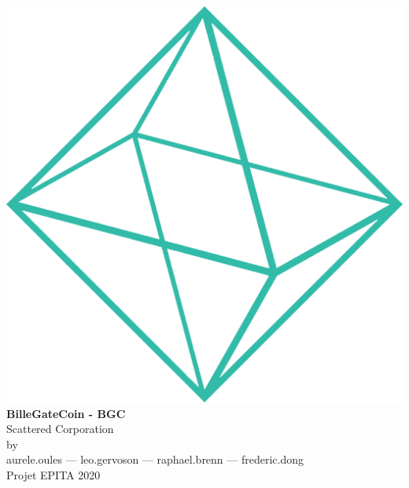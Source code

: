 \documentclass{article}
\begin{document}
\makeatletter
    \begin{titlepage}
        \begin{center}
            \pagecolor{background}
            \color{white}
            \includegraphics[width=0.5\linewidth]{assets/shape.png}\\[10ex]
            {\huge \bfseries BilleGateCoin - BGC}\\[2ex] 
            {\LARGE Scattered Corporation}\\[20ex]
            \large{by\\[2ex]aurele.oules  —  leo.gervoson  —  raphael.brenn  —  frederic.dong}\\[16ex] 
            {\large Projet EPITA 2020}
        \end{center}
    \end{titlepage}
\makeatother
\thispagestyle{empty}

\newpage
\begin{center}
\color{white}
\tableofcontents
\end{center}
\newpage
\pagecolor{white}
\sectionfont{\color{greendark}}  %

\fancyhf{}
\renewcommand{\headrulewidth}{0pt}
\renewcommand{\footrulewidth}{1pt}
\newcommand\bold[1]{\textcolor{green}{\bfseries{#1}}}
\newcommand\boldblack[1]{\textcolor{background}{\bfseries{#1}}}
\renewcommand{\footrule}{\hbox to\headwidth{\color{green}\leaders\hrule height \footrulewidth\hfill}}

\rfoot{\thepage}
\pagestyle{fancy}
\renewcommand\seriesdefault{l}
\end{document}
